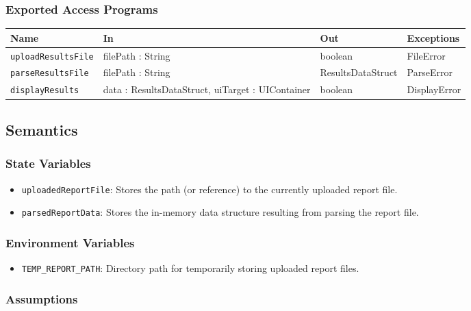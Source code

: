 \documentclass[12pt, titlepage]{article}
\begin{document}
\subsubsection{Exported Access Programs}

\begin{center}
\begin{tabular}{p{5cm} p{3.5cm} p{3.5cm} p{2cm}}
\hline
\textbf{Name} & \textbf{In} & \textbf{Out} & \textbf{Exceptions} \\
\hline
\texttt{uploadResultsFile} & filePath : String & boolean & FileError \\
\texttt{parseResultsFile} & filePath : String & ResultsDataStruct & ParseError \\
\texttt{displayResults} & data : ResultsDataStruct, uiTarget : UIContainer & boolean & DisplayError \\
\hline
\end{tabular}
\end{center}

\subsection{Semantics}

\subsubsection{State Variables}

\begin{itemize}
    \item \texttt{uploadedReportFile}: Stores the path (or reference) to the currently uploaded report file.
    \item \texttt{parsedReportData}: Stores the in-memory data structure resulting from parsing the report file.
\end{itemize}

\subsubsection{Environment Variables}

\begin{itemize}
    \item \texttt{TEMP\_REPORT\_PATH}: Directory path for temporarily storing uploaded report files.
\end{itemize}

\subsubsection{Assumptions}
\end{document}
